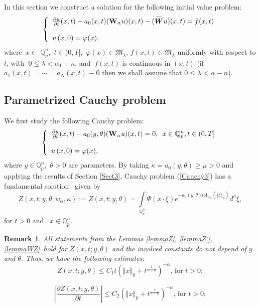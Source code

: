 \documentclass{amsart}\usepackage{amsfonts}
\theoremstyle{plain}
\newtheorem{remark}[theorem]{Remark}
\numberwithin{equation}{section}
\begin{document}
In this section we construct a solution for the following initial value
problem:\begin{equation}
\left\{
\begin{array}
[c]{l}\frac{\partial u}{\partial t}(x,t)-a_{0}(x,t)(\boldsymbol{\mathbf{W}}_{\alpha
}u)(x,t)-(\widetilde{\boldsymbol{W}}u)(x,t)=f(x,t)\\
\\
u\left(  x,0\right)  =\varphi(x),
\end{array}
\right.  \label{Cauchy2}\end{equation}
where\ $x\in$ $\mathbb{Q}_{p}^{n},$ $t\in(0,T],$ $\varphi(x)\in
\mathcal{\mathfrak{M}}_{\lambda}$, $f(x,t)\in\mathcal{\mathfrak{M}}_{\lambda}$
uniformly with respect to $t$, with $\ 0\leq\lambda<\alpha_{1}-n$, and
$\ f(x,t)$ is continuous in $(x,t)$ (if $a_{1}(x,t)=\cdots=a_{N}(x,t)\equiv0$
then we shall assume that $0\leq\lambda<\alpha-n$).

\subsection{Parametrized Cauchy problem}

We first study the following Cauchy problem:\begin{equation}
\left\{
\begin{array}
[c]{l}\frac{\partial u}{\partial t}(x,t)-a_{0}(y,\theta)(\boldsymbol{\mathbf{W}}_{\alpha}u)(x,t)=0\text{, }\ x\in\mathbb{Q}_{p}^{n},t\in(0,T]\\
\\
u\left(  x,0\right)  =\varphi(x),
\end{array}
\right.  \label{Cauchy3}\end{equation}
where $y\in\mathbb{Q}_{p}^{n}$,\ $\theta>0$ are parameters. By taking
$\kappa=a_{0}(y,\theta)\geq\mu>0$ and applying the results of Section
\ref{Sect3}, Cauchy problem (\ref{Cauchy3}) has a fundamental solution \ given
by\[
Z(x,t;y,\theta,w_{\alpha},\kappa):=Z(x,t;y,\theta)={\displaystyle\int\limits_{\mathbb{Q}_{p}^{n}}}
\Psi(x\cdot\xi)e^{-a_{0}(y,\theta)tA_{w_{\alpha}}(\left\Vert \xi\right\Vert
_{p})}d^{n}\xi,
\]
for $t>0$ and \ $x\in\mathbb{Q}_{p}^{n}$.

\begin{remark}
All statements from the Lemmas \ref{lemmaZ}, \ref{lemmaZ'}, \ref{lemmaWZ}\ hold for $Z(x,t;y,\theta)$ and the involved constants do not depend of $y$
and $\theta$. Thus, we have the following estimates:\begin{equation}
Z(x,t;y,\theta)\leq C_{1}t\left(  \left\Vert x\right\Vert _{p}+t^{\frac
{1}{\alpha-n}}\right)  ^{-\alpha}\text{, for }t>0; \label{Est1}\end{equation}

\end{remark}
\begin{equation}
\left\vert \frac{\partial Z(x,t;y,\theta)}{\partial t}\right\vert \leq
C_{2}\left(  \left\Vert x\right\Vert _{p}+t^{\frac{1}{\alpha-n}}\right)
^{-\alpha}\text{, for }t>0; \label{Est2}\end{equation}
\end{document}
